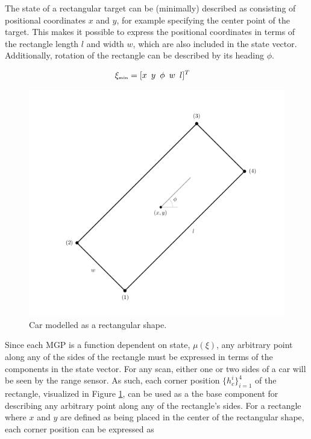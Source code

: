 The state of a rectangular target can be (minimally) described as consisting of positional coordinates $x$ and $y$, for example specifying the center point of the target. This makes it possible to express the positional coordinates in terms of the rectangle length $l$ and width $w$, which are also included in the state vector. Additionally, rotation of the rectangle can be described by its heading $\phi$.

\begin{equation}
    \begin{split}
        \xi_{\text{\tiny{min}}} &= [x\enskip y\enskip  \phi\enskip  w\enskip  l]^T
    \end{split}
\end{equation}

\begin{figure}[H]
    \centering
    \includegraphics[width = 0.6\linewidth]{include/images/recFin.png}
    \caption{Car modelled as a rectangular shape.}
    \label{fig:spatialExample}
\end{figure}

Since each MGP is a function dependent on state, $\mu(\xi)$, any arbitrary point along any of the sides of the rectangle must be expressed in terms of the components in the state vector. For any scan, either one or two sides of a car will be seen by the range sensor. As such, each corner position $\{h_{c}^{i}\}_{i=1}^4$ of the rectangle, visualized in Figure \ref{fig:spatialExample}, can be used as a the base component for describing any arbitrary point along any of the rectangle's sides. For a rectangle where $x$ and $y$ are defined as being placed in the center of the rectangular shape, each corner position can be expressed as 

